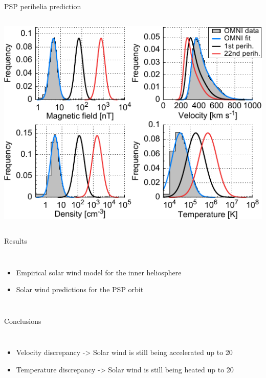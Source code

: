 \begin{frame}[c]{PSP perihelia prediction}{}
	\begin{columns}[c]
		
		\includegraphics[width=\textwidth]{../figures_paper/SPP_sw_distributions_b.pdf}


	\end{columns}
\end{frame}

\begin{frame}[c]{Results}{}
	\begin{columns}[c]
	\column{\textwidth}
		
		\begin{itemize}%
			\item Empirical solar wind model for the inner heliosphere
			\item Solar wind predictions for the PSP orbit
		\end{itemize}
		
	\end{columns}
\end{frame}
\begin{frame}[c]{Conclusions}{}
	\begin{columns}[c]
	\column{\textwidth}
		
		\begin{itemize}%
			\item Velocity discrepancy -> Solar wind is still being accelerated up to 20\,\Rs{}
			\item Temperature discrepancy -> Solar wind is still being heated up to 20\,\Rs{}
		\end{itemize}
		
	\end{columns}
\end{frame}


